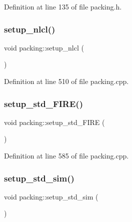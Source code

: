 Definition at line 135 of file packing.\+h.

\mbox{\label{classpacking_a1f49ca3dbade782f8da82c946a2be238}} 
\subsubsection{\texorpdfstring{setup\+\_\+nlcl()}{setup\_nlcl()}}
{\footnotesize\ttfamily void packing\+::setup\+\_\+nlcl (\begin{DoxyParamCaption}{ }\end{DoxyParamCaption})}



Definition at line 510 of file packing.\+cpp.

\mbox{\label{classpacking_a02683527b4a5e41e2b9eaac44672cf9f}} 
\subsubsection{\texorpdfstring{setup\+\_\+std\+\_\+\+F\+I\+R\+E()}{setup\_std\_FIRE()}}
{\footnotesize\ttfamily void packing\+::setup\+\_\+std\+\_\+\+F\+I\+RE (\begin{DoxyParamCaption}{ }\end{DoxyParamCaption})}



Definition at line 585 of file packing.\+cpp.

\mbox{\label{classpacking_afc22f53f3fa942d5347a3ebfeacae2bf}} 
\subsubsection{\texorpdfstring{setup\+\_\+std\+\_\+sim()}{setup\_std\_sim()}}
{\footnotesize\ttfamily void packing\+::setup\+\_\+std\+\_\+sim (\begin{DoxyParamCaption}{ }\end{DoxyParamCaption})}



